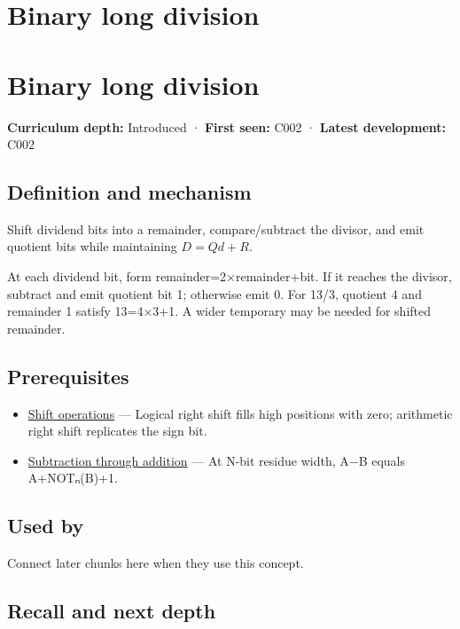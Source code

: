 \hypertarget{appendix-89985e6a2685}{}
\section*{Binary long division}
\section{Binary long division}\label{binary-long-division}

\textbf{Curriculum depth:} Introduced · \textbf{First seen:} C002 · \textbf{Latest development:} C002

\subsection{Definition and mechanism}\label{definition-and-mechanism}

Shift dividend bits into a remainder, compare/subtract the divisor, and emit quotient bits while maintaining \(D=Qd+R\).

At each dividend bit, form remainder=2×remainder+bit. If it reaches the divisor, subtract and emit quotient bit 1; otherwise emit 0. For 13/3, quotient 4 and remainder 1 satisfy 13=4×3+1. A wider temporary may be needed for shifted remainder.

\subsection{Prerequisites}\label{prerequisites}

\begin{itemize}
\tightlist
\item
  \hyperref[appendix-73425b25118e]{Shift operations} --- Logical right shift fills high positions with zero; arithmetic right shift replicates the sign bit.
\item
  \hyperref[appendix-1c7df340573e]{Subtraction through addition} --- At N-bit residue width, A−B equals A+NOTₙ(B)+1.
\end{itemize}

\subsection{Used by}\label{used-by}

Connect later chunks here when they use this concept.

\subsection{Recall and next depth}\label{recall-and-next-depth}

